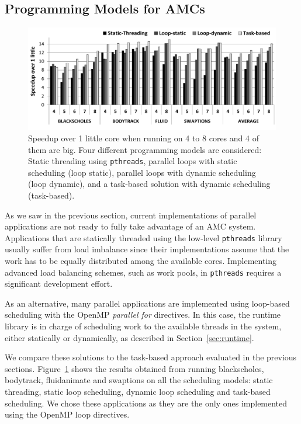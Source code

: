\subsection{Programming Models for AMCs}

\begin{figure}
        \centering
        \includegraphics[width=\columnwidth]{figures/speedup-ompssVSopenmp_new}
        \vspace{-0.5cm}
        \caption{Speedup over 1 little core when running on 4 to 8 cores and 4 of them are big. 
Four different programming models are considered: Static threading using \texttt{pthreads}, 
parallel loops with static scheduling (loop static), parallel loops with dynamic scheduling (loop 
dynamic), and a task-based solution with dynamic scheduling (task-based).}%
        \label{fig:prog_models}%
\end{figure}

As we saw in the previous section, current implementations of parallel applications are not ready to fully take advantage of an AMC system.
Applications that are statically threaded using the low-level \texttt{pthreads} library usually suffer from load imbalance since their implementations assume that the work has to be equally distributed among the available cores. 
Implementing advanced load balancing schemes, such as
work pools, in \texttt{pthreads} requires a significant development effort.

As an alternative, many parallel applications are implemented using loop-based scheduling with the 
OpenMP \emph{parallel for} directives. 
In this case, the runtime library is in charge of scheduling work to the available threads in the system, either statically or dynamically, as described in Section~\ref{sec:runtime}.

We compare these solutions to the task-based approach evaluated in the previous sections. 
Figure~\ref{fig:prog_models} shows the results obtained from running blackscholes, bodytrack, fluidanimate and swaptions on all the scheduling models: static threading, static loop scheduling, dynamic loop scheduling and task-based scheduling. 
We chose these applications as they are the only ones implemented using the OpenMP loop directives.

